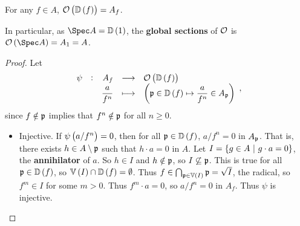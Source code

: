 \pagebreak

\begin{proposition}
For any $ f \in A $, $ \OOO\br{\DD\br{f}} = A_f $.
\end{proposition}

In particular, as $ \Spec A = \DD\br{1} $, the \textbf{global sections} of $ \mathcal{O} $ is $ \OOO\br{\Spec A} = A_1 = A $.

\begin{proof}
Let
$$ \function[\psi]{A_f}{\OOO\br{\DD\br{f}}}{\dfrac{a}{f^n}}{\br{\ppp \in \DD\br{f} \mapsto \dfrac{a}{f^n} \in A_\ppp}}, $$
since $ f \notin \mathfrak{p} $ implies that $ f^n \notin \mathfrak{p} $ for all $ n \ge 0 $.
\begin{itemize}
\item Injective. If $ \psi\br{a / f^n} = 0 $, then for all $ \ppp \in \DD\br{f} $, $ a / f^n = 0 $ in $ A_{\mathfrak{p}} $. That is, there exists $ h \in A \setminus \mathfrak{p} $ such that $ h \cdot a = 0 $ in $ A $. Let $ I = \cbr{g \in A \st g \cdot a = 0} $, the \textbf{annihilator} of $ a $. So $ h \in I $ and $ h \notin \mathfrak{p} $, so $ I \not\subseteq \mathfrak{p} $. This is true for all $ \ppp \in \DD\br{f} $, so $ \VV\br{I} \cap \DD\br{f} = \emptyset $. Thus $ f \in \bigcap_{\ppp \in \VV\br{I}} \ppp = \sqrt{I} $, the radical, so $ f^m \in I $ for some $ m > 0 $. Thus $ f^m \cdot a = 0 $, so $ a / f^n = 0 $ in $ A_f $. Thus $ \psi $ is injective.



\end{itemize}
\end{proof}
